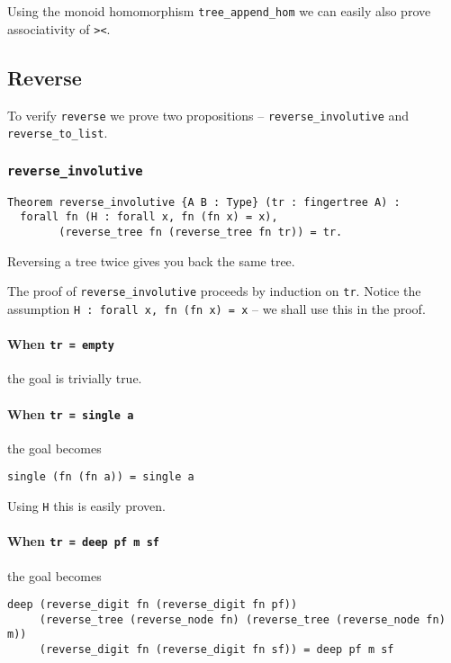 \documentclass{article}
\newcommand{\code}[1]{\texttt{#1}}
\begin{document}
Using the monoid homomorphism \code{tree\_append\_hom} we can easily
also prove associativity of \code{><}.

\subsection{Reverse}
To verify \code{reverse} we prove two propositions --
\code{reverse\_involutive} and \code{reverse\_to\_list}.

\subsubsection{\code{reverse\_involutive}}

\begin{listing}[H]
\begin{verbatim}
Theorem reverse_involutive {A B : Type} (tr : fingertree A) :
  forall fn (H : forall x, fn (fn x) = x),
        (reverse_tree fn (reverse_tree fn tr)) = tr.
\end{verbatim}
\caption{Reversing a tree twice gives you back the same tree.}
\label{reverse_involutive}
\end{listing}

The proof of \code{reverse\_involutive} proceeds by induction on \code{tr}.
Notice the assumption \code{H : forall x, fn (fn x) = x} -- we shall use this
in the proof.

\paragraph*{When \code{tr = empty}} the goal is trivially true.

\paragraph*{When \code{tr = single a}} the goal becomes
\begin{verbatim}
single (fn (fn a)) = single a
\end{verbatim}

Using \code{H} this is easily proven.

\paragraph*{When \code{tr = deep pf m sf}} the goal becomes
\begin{verbatim}
deep (reverse_digit fn (reverse_digit fn pf))
     (reverse_tree (reverse_node fn) (reverse_tree (reverse_node fn) m))
     (reverse_digit fn (reverse_digit fn sf)) = deep pf m sf
\end{verbatim}
\end{document}
